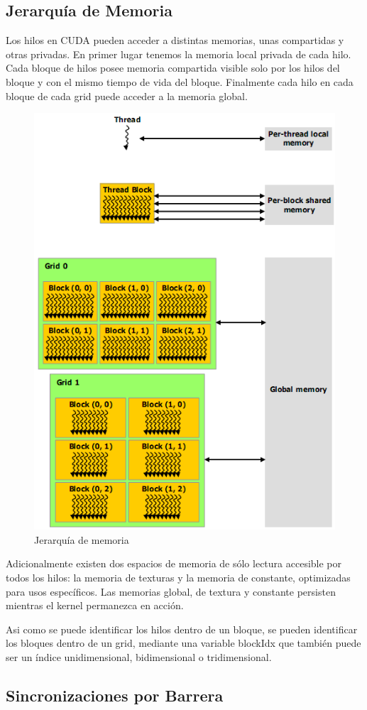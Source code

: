 \documentclass[twoside]{article}
\begin{document}
\subsection{Jerarquía de Memoria}

Los hilos en CUDA pueden acceder a distintas memorias, unas compartidas y otras privadas. En primer lugar tenemos la memoria local privada de cada hilo. Cada bloque de hilos posee memoria compartida visible solo por los hilos del bloque y con el mismo tiempo de vida del bloque. Finalmente cada hilo en cada bloque de cada grid puede acceder a la memoria global.

\begin{figure}
   \begin{center}
      \includegraphics[width=.5\textwidth]{MemoriaHierarchy.png}
      \caption{\label{fig:MemoriaHierarchy} Jerarquía de memoria}
   \end{center}
\end{figure}

Adicionalmente existen dos espacios de memoria de sólo lectura accesible por todos los hilos: la memoria de texturas y la memoria de constante, optimizadas para usos específicos. Las memorias global, de textura y constante persisten mientras el kernel permanezca en acción.

Asi como se puede identificar los hilos dentro de un bloque, se pueden identificar los bloques dentro de un grid, mediante una variable blockIdx que también puede ser un índice unidimensional, bidimensional o tridimensional.

\subsection{Sincronizaciones por Barrera}
\end{document}
